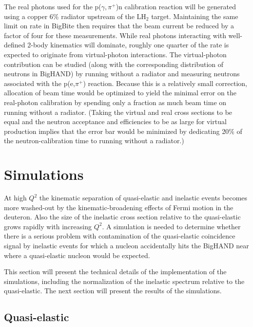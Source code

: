 \documentclass[12pt,letterpaper,oneside]{article}
\begin{document}
The real photons used for the p($\gamma,\pi^+$)n calibration reaction
will be generated using a copper 6\%  radiator upstream of the LH$_2$
target.  Maintaining the same limit on rate in BigBite then requires that
the beam current be reduced by a factor of four for these
measurements.  While real photons interacting with well-defined 2-body
kinematics will dominate, roughly one quarter of the rate is expected to
originate from virtual-photon interactions.  The virtual-photon
contribution can be studied (along with the corresponding distribution
of neutrons in BigHAND) by running without a radiator and 
measuring neutrons associated with the
p(e,$\pi^+$) reaction.  Because this is a relatively small correction,
allocation of beam time would be optimized to yield the minimal error
on the real-photon calibration by spending only a fraction as much
beam time on running without a radiator.  (Taking the virtual and real
cross sections to be equal and the neutron acceptance and
efficiencies to be as large for virtual production implies that
the error bar would be minimized by dedicating 20$\%$ of the
neutron-calibration time to running without a radiator.)  

\section{Simulations}

At high $Q^2$ the kinematic separation of quasi-elastic and inelastic
events becomes more washed-out by the kinematic-broadening effects of 
Fermi motion in the deuteron.  Also the size of the inelastic
cross section relative to the quasi-elastic grows rapidly with
increasing $Q^2$.  A simulation is needed to determine whether there
is a serious problem with contamination of the quasi-elastic coincidence
signal by inelastic events for which a nucleon accidentally hits
the BigHAND near where a quasi-elastic nucleon would be expected.

This section will present the technical details of the implementation
of the simulations, including the normalization of the inelastic
spectrum relative to the quasi-elastic.  The next section will present
the results of the simulations.

\subsection{Quasi-elastic}
\end{document}
